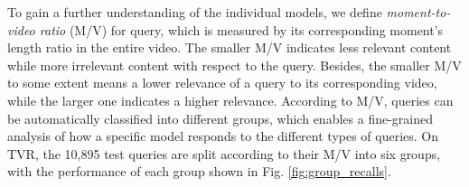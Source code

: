 \documentclass[sigconf]{acmart}
\begin{document}
\begin{table} [tb!]
\renewcommand{\arraystretch}{1.0}
\caption{Performance of PRVR on the Charades-STA dataset. Visual feature: I3D.
}\vspace{-4mm}
\label{tab:sota-charades}
\centering 
{}\end{table}

To gain a further understanding of the individual models, we define \textit{moment-to-video ratio} (M/V) for query, which is measured by its corresponding moment's length ratio in the entire video.
The smaller M/V indicates less relevant content while more irrelevant content with respect to the query.
Besides, the smaller M/V to some extent means a lower relevance of a query to its corresponding video, while the larger one indicates a higher relevance.
According to M/V, queries can be automatically classified into different groups, which enables a fine-grained analysis of how a specific model responds to the different types of queries.
On TVR, the 10,895 test queries are split according to their M/V into six groups, with the performance of each group shown in Fig. \ref{fig:group_recalls}.
\end{document}
